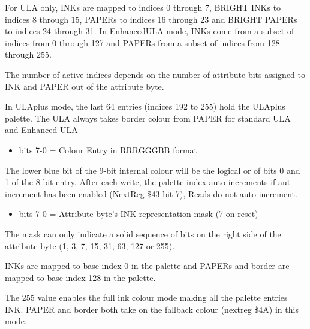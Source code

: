 For ULA only, INKs are mapped to indices 0 through 7, BRIGHT INKs to
indices 8 through 15, PAPERs to indices 16 through 23 and BRIGHT
PAPERs to indices 24 through 31.  In EnhancedULA mode, INKs come from
a subset of indices from 0 through 127 and PAPERs from a subset of
indices from 128 through 255.

The number of active indices depends on the number of attribute bits
assigned to INK and PAPER out of the attribute byte.

In ULAplus mode, the last 64 entries (indices 192 to 255) hold the
ULAplus palette.  The ULA always takes border colour from PAPER for
standard ULA and Enhanced ULA

\begin{itemize}
\item bits 7-0 = Colour Entry in RRRGGGBB format
\end{itemize}
The lower blue bit of the 9-bit internal colour will be the logical or
of bits 0 and 1 of the 8-bit entry. After each write, the palette
index auto-increments if aut-increment has been enabled (NextReg \$43
bit 7), Reads do not auto-increment.

\begin{itemize}
\item bits 7-0 = Attribute byte's INK representation mask (7 on reset)
\end{itemize}
The mask can only indicate a solid sequence of bits on the right side
of the attribute byte (1, 3, 7, 15, 31, 63, 127 or 255).

INKs are mapped to base index 0 in the palette and PAPERs and border
are mapped to base index 128 in the palette.

The 255 value enables the full ink colour mode making all the palette
entries INK. PAPER and border both take on the fallback colour
(nextreg \$4A) in this mode.

